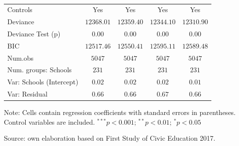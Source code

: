 \documentclass[
    behavsci,
    article,
    submit,
moreauthors
]{mdpi}
\begin{document}
\begin{table}
{\begin{center}
{\begin{threeparttable}
\begin{tabular}{l c c c c}
\midrule
Controls                                  & Yes           & Yes           & Yes           & Yes           \\
Deviance                                  & $12368.01$    & $12359.40$    & $12344.10$    & $12310.90$    \\
Deviance Test (p)                         & $0.00$        & $0.00$        & $0.00$        & $0.00$        \\
BIC                                       & $12517.46$    & $12550.41$    & $12595.11$    & $12589.48$    \\
Num.obs                                   & $5047$        & $5047$        & $5047$        & $5047$        \\
Num. groups: Schools                      & $231$         & $231$         & $231$         & $231$         \\
Var: Schools (Intercept)                  & $0.02$        & $0.02$        & $0.02$        & $0.01$        \\
Var: Residual                             & $0.66$        & $0.66$        & $0.67$        & $0.66$        \\
\bottomrule
\end{tabular}
\begin{tablenotes}[flushleft]
\scriptsize{\item Note: Cells contain regression coefficients with standard errors in parentheses. Control variables are included. $^{***}p<0.001$; $^{**}p<0.01$; $^{*}p<0.05$ \\ \item Source: own elaboration based on First Study of Civic Education 2017.}
\end{tablenotes}
\end{threeparttable}
}
\caption{}
\label{table:coefficients}
\end{center}

}

\end{table}%
\end{document}
